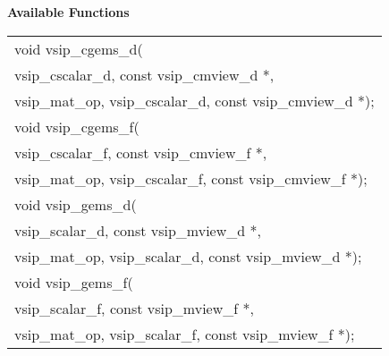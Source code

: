 \\\cvsiplh
\\ \hspace*{.8cm} \vspace*{.1cm} \textbf{Available Functions }
\\ \hspace*{0.03\textwidth} {
\ttfamily
\begin{tabular}[H]{l}
void vsip\_cgems\_d(\\*\hspace{.6cm}vsip\_cscalar\_d, const vsip\_cmview\_d *,\\*\hspace{.6cm}vsip\_mat\_op, vsip\_cscalar\_d, const vsip\_cmview\_d *);\\
void vsip\_cgems\_f(\\*\hspace{.6cm}vsip\_cscalar\_f, const vsip\_cmview\_f *,\\*\hspace{.6cm}vsip\_mat\_op, vsip\_cscalar\_f, const vsip\_cmview\_f *);\\
void vsip\_gems\_d(\\*\hspace{.6cm}vsip\_scalar\_d, const vsip\_mview\_d *,\\*\hspace{.6cm}vsip\_mat\_op, vsip\_scalar\_d, const vsip\_mview\_d *);\\
void vsip\_gems\_f(\\*\hspace{.6cm}vsip\_scalar\_f, const vsip\_mview\_f *,\\*\hspace{.6cm}vsip\_mat\_op, vsip\_scalar\_f, const vsip\_mview\_f *);\\
\end{tabular}
}
\\\pyjvsiph
{}

